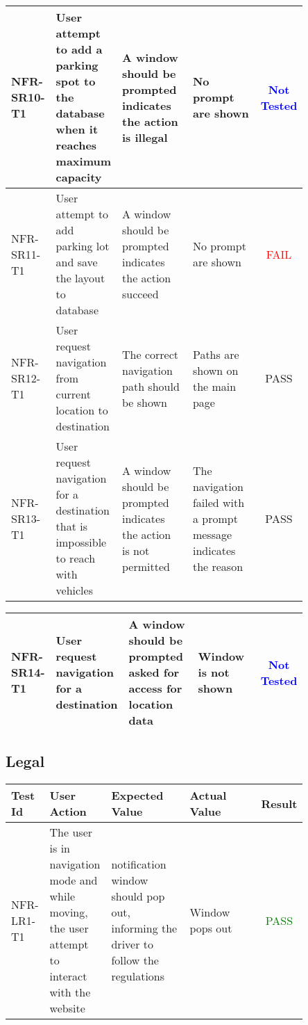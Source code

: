 \documentclass[12pt, titlepage]{article}
\begin{document}
\newpage
\begin{center}
\begin{tabular}{|p{0.10\linewidth}|p{0.15\linewidth}|p{0.30\linewidth}|p{0.30\linewidth}|c|} 
\hline
NFR-SR10-T1 & User attempt to add a parking spot to the database when it reaches
maximum capacity & A window should be prompted indicates the action is illegal
& No prompt are shown & \textcolor{blue}{Not Tested} \\ 
\hline
NFR-SR11-T1 & User attempt to add parking lot and save the layout to database &
A window should be prompted indicates the action succeed  & No prompt are shown
& \textcolor{red}{FAIL} \\ 
\hline
NFR-SR12-T1 & User request navigation from current location to destination & The
correct navigation path should be shown & Paths are shown on the main page &
\textcolor{OliveGreen}{PASS} \\ 
\hline
NFR-SR13-T1 & User request navigation for a destination that is impossible to
reach with vehicles & A window should be prompted indicates the action is not
permitted & The navigation failed with a prompt message indicates the reason &
\textcolor{OliveGreen}{PASS} \\ 
\hline
\end{tabular}
\end{center}

\newpage
\begin{center}
\begin{tabular}{|p{0.10\linewidth}|p{0.15\linewidth}|p{0.30\linewidth}|p{0.30\linewidth}|c|} 
\hline
NFR-SR14-T1 & User request navigation for a destination & A window should be
prompted asked for access for location data & Window is not shown &
\textcolor{blue}{Not Tested} \\ 
\hline
\end{tabular}
\end{center}

\subsection{Legal}

\begin{center}
\begin{tabular}{|p{0.10\linewidth}|p{0.15\linewidth}|p{0.30\linewidth}|p{0.30\linewidth}|c|} 
\hline
\textbf{Test Id} & \textbf{User Action} & \textbf{Expected Value} &
\textbf{Actual Value} & \textbf{Result} \\
\hline
NFR-LR1-T1 & The user is in navigation mode and while moving, the user attempt
to interact with the website &  notification window should pop out, informing
the driver to follow the regulations & Window pops out & \textcolor{Green}{PASS}
\\
\hline
\end{tabular}
\end{center}
\end{document}
